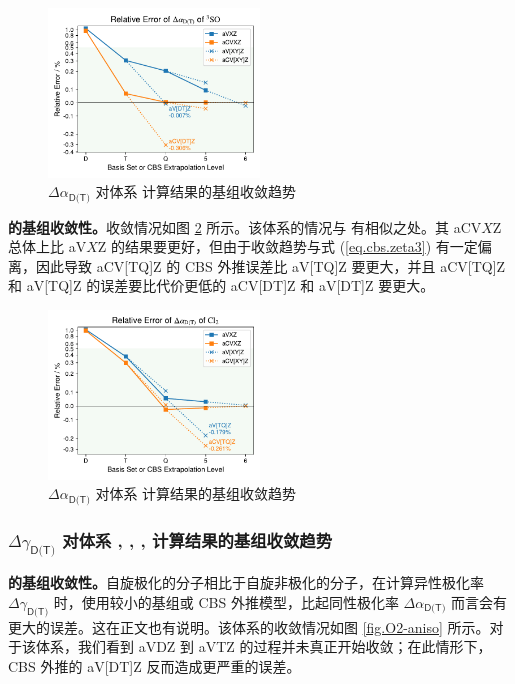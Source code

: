 \begin{figure}[ht]
    \centering
    \caption{$\Delta \alpha_\textsf{D(T)}$ 对体系  计算结果的基组收敛趋势}
    \label{fig.SO-iso}
    \includegraphics[width=0.5\textwidth]{assets/SO-iso.pdf}
\end{figure}

\textbf{ 的基组收敛性。}收敛情况如图 \ref{fig.Cl2-iso} 所示。该体系的情况与  有相似之处。其 aCV$X$Z 总体上比 aV$X$Z 的结果要更好，但由于收敛趋势与式 (\ref{eq.cbs.zeta3}) 有一定偏离，因此导致 aCV[TQ]Z 的 CBS 外推误差比 aV[TQ]Z 要更大，并且 aCV[TQ]Z 和 aV[TQ]Z 的误差要比代价更低的 aCV[DT]Z 和 aV[DT]Z 要更大。

\begin{figure}[ht]
    \centering
    \caption{$\Delta \alpha_\textsf{D(T)}$ 对体系  计算结果的基组收敛趋势}
    \label{fig.Cl2-iso}
    \includegraphics[width=0.5\textwidth]{assets/Cl2-iso.pdf}
\end{figure}

\subsubsection{$\Delta \gamma_\textsf{D(T)}$ 对体系 , , ,  计算结果的基组收敛趋势}
\label{sec.5.s5}

\textbf{ 的基组收敛性。}自旋极化的分子相比于自旋非极化的分子，在计算异性极化率 $\Delta \gamma_\textsf{D(T)}$ 时，使用较小的基组或 CBS 外推模型，比起同性极化率 $\Delta \alpha_\textsf{D(T)}$ 而言会有更大的误差。这在正文也有说明。该体系的收敛情况如图 \ref{fig.O2-aniso} 所示。对于该体系，我们看到 aVDZ 到 aVTZ 的过程并未真正开始收敛；在此情形下，CBS 外推的 aV[DT]Z 反而造成更严重的误差。

